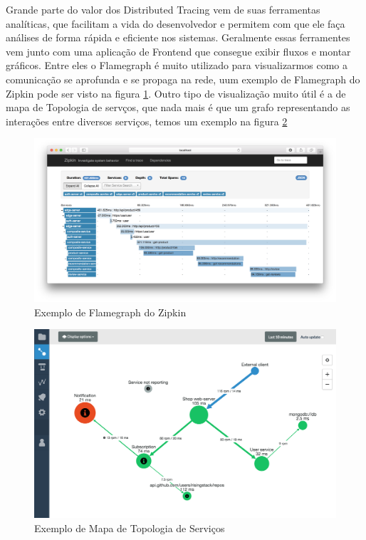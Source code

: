 	Grande parte do valor dos Distributed Tracing vem de suas ferramentas analíticas, que facilitam a vida do desenvolvedor e permitem com que ele faça análises de forma rápida e eficiente nos sistemas. Geralmente essas ferramentes vem junto com uma aplicação de Frontend que consegue exibir fluxos e montar gráficos. Entre eles o Flamegraph é muito utilizado para visualizarmos como a comunicação se aprofunda e se propaga na rede, uum exemplo de Flamegraph do Zipkin pode ser visto na figura \ref{fig_zipking_sample}. Outro tipo de visualização muito útil é a de mapa de Topologia de servços, que nada mais é que um grafo representando as interações entre diversos serviços, temos um exemplo na figura \ref{fig_topology_map}
	
	\begin{figure}[htb]
		\caption{\label{fig_zipking_sample}Exemplo de Flamegraph do Zipkin}
		\begin{center}
		\includegraphics[scale=0.16]{pictures/zipkin-sample.png}
		\end{center}
	\end{figure}
	
	\begin{figure}[htb]
		\caption{\label{fig_topology_map}Exemplo de Mapa de Topologia de Serviços}
		\begin{center}
		\includegraphics[scale=0.16]{pictures/service_topology_map.png}
		\end{center}
	\end{figure}
	
